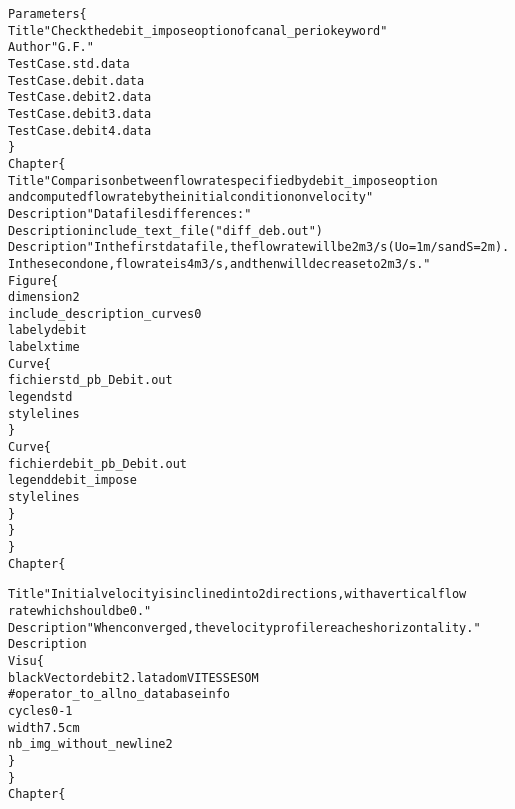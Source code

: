 \begin{alltt}
Parameters \{
        Title "Check the debit_impose option of canal_perio keyword"
        Author "G.F."
        TestCase . std.data
        TestCase . debit.data
        TestCase . debit2.data
        TestCase . debit3.data
        TestCase . debit4.data
\}
Chapter \{
        Title "Comparison between flow rate specified by debit_impose option 
            and computed flow rate by the initial condition on velocity"
        Description "Data files differences:"
        Description include_text_file("diff_deb.out")
        Description "In the first data file, the flow rate will be 2 m3/s (Uo=1 m/s and S=2m). 
            In the second one, flow rate is 4 m3/s, and then will decrease to 2 m3/s."
        Figure \{
                dimension 2
                include_description_curves 0
                labely debit
                labelx time
                Curve \{
                        fichier std_pb_Debit.out
                        legend std
                        style lines
                \}
                Curve \{
                        fichier debit_pb_Debit.out
                        legend debit_impose
                        style lines
                \}
        \}
\}
Chapter \{
        
        Title "Initial velocity is inclined into 2 directions, with a vertical flow 
            rate which should be 0."
        Description "When converged, the velocity profile reaches horizontality."
        Description
        Visu \{
                blackVector debit2.lata dom VITESSE SOM
                # operator_to_all no_databaseinfo
                cycles 0 -1
                width 7.5cm
                nb_img_without_newline 2 
        \}
\}
Chapter \{
        

\end{alltt}
